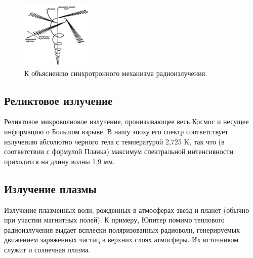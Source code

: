 \documentclass[a4paper,12pt]{extarticle}
\begin{document}
\begin{figure}[!htb]
	\centering
	\includegraphics[width=0.3\textwidth]{synchrotron_radiation.png}
	\caption{
		К объяснению синхротронного механизма радиоизлучения.
	}
	\label{fig:synchrotron_radiation}
\end{figure}
\newpage
\subsection{Реликтовое излучение}
Реликтовое микроволновое излучение, пронизывающее весь Космос и несущее информацию о Большом взрыве. В нашу эпоху его спектр соответствует излучению абсолютно черного тела с температурой 2,725 K, так что (в соответствии с формулой Планка) максимум спектральной интенсивности приходится на длину волны 1,9 мм.

\subsection{Излучение плазмы}
Излучение плазменных волн, рожденных в атмосферах звезд и планет (обычно при участии магнитных полей). К примеру, Юпитер помимо теплового радиоизлучения выдает всплески поляризованных радиоволн, генерируемых движением заряженных частиц в верхних слоях атмосферы. Их источником служит и солнечная плазма.


\clearpage
\sloppy
\printbibliography
\end{document}
